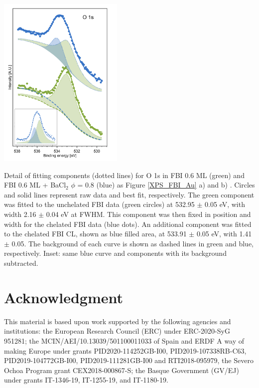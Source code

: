 \documentclass[aps,prl,reprint,longbibliography,superscriptaddress, english]{revtex4-1}
\begin{document}
\begin{center}
	\includegraphics[width=0.45\textwidth]{figures/fig6_fit.pdf}
	\captionsetup{type=figure} %
	\caption{\label{XPS_fits} Detail of fitting components (dotted lines) for O 1s in FBI 0.6 ML (green) and FBI 0.6 ML + BaCl$_2$ $\phi$ = 0.8 (blue) as Figure \ref{XPS_FBI_Au} a) and b) . Circles and solid lines represent raw data and best fit, respectively. The green component was fitted to the unchelated FBI data (green circles) at 532.95 $\pm$ 0.05 eV, with width 2.16 $\pm$ 0.04 eV at FWHM. This component was then fixed in position and width for the chelated FBI data (blue dots). An additional component was fitted to the chelated FBI CL, shown as blue filled area, at 533.91 $\pm$ 0.05 eV,  with 1.41 $\pm$ 0.05. The background of each curve is shown as dashed lines in green and blue, respectively. Inset: same blue curve and components with its background subtracted.}
\end{center}


\section{Acknowledgment}
This material is based upon work supported by the following agencies and institutions: the European Research Council (ERC) under ERC-2020-SyG 951281; the MCIN/AEI/10.13039/501100011033 of Spain and ERDF A way of making Europe under grants PID2020-114252GB-I00, PID2019-107338RB-C63, PID2019-104772GB-I00, PID2019-111281GB-I00 and RTI2018-095979, the Severo Ochoa Program grant CEX2018-000867-S; the Basque Government (GV/EJ) under grants IT-1346-19, IT-1255-19, and IT-1180-19. 
\end{document}
